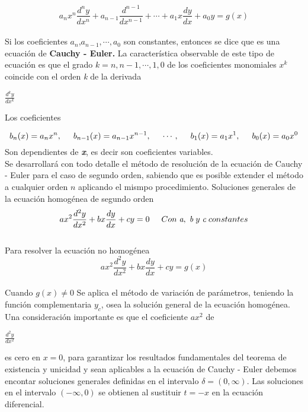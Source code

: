 \documentclass[12pt,letterpaper]{article}
\begin{document}
$$a_{n}x^{n}\frac{d^{n}y}{dx^{n}} + a_{n-1}\frac{d^{n-1}}{dx^{n-1}} + \cdots + a_{1}x\frac{dy}{dx} + a_{0}y=g(x)$$\\
Si los coeficientes 
$a_{n}$,$a_{n-1},\cdots,a_{0}$  
son constantes, entonces se dice que es una ecuación de \textbf{Cauchy - Euler.} La característica observable de este tipo de ecuación es que el grado ${k = n,n-1,}\cdots,1,0$ de los coeficientes monomiales $x^{k}$ coincide con el orden 
\emph{k} de la derivada \begin{Large} $\frac{d^{k}y}{dx^{k}}$
\end{Large}
\begin{flushleft}
Los coeficientes\\
\end{flushleft}
$$b_{n}(x)=a_{n}x^{n},\hspace{0.5cm}b_{n-1}(x)=a_{n-1}x^{n-1},\hspace{0.5cm}\cdots,\hspace{0.5cm}b_{1}(x)=a_{1}x^{1},\hspace{0.5cm}b_{0}(x)=a_{0}x^{0}$$
Son dependientes de \textbf{\emph{x}}, es decir son coeficientes variables.\\
Se desarrollará con todo detalle el método de resolución de la ecuación de Cauchy - Euler para el caso de segundo orden, sabiendo que es posible extender el método a cualquier orden $n$ aplicando el mismpo procedimiento.
Soluciones generales de la ecuación homogénea de segundo orden\\
$$ax^{2}\frac{d^{2}y}{dx^{2}}+bx\frac{dy}{dx}+cy=0 \hspace{0.5cm} Con \hspace{0.1cm}\emph{a},\hspace{0.1cm} \emph{b}\hspace{0.1cm} y  \hspace{0.1cm}\emph{c} \hspace{0.1cm}constantes$$\\
Para resolver la ecuación no homogénea\\
$$ax^{2}\frac{d^{2}y}{dx^{2}}+bx\frac{dy}{dx}+cy=g(x)$$\\
Cuando $g(x)\neq 0$ Se aplica el método de variación de parámetros, teniendo la función complementaria $y_{c}$, osea la solución general de la ecuación homogénea.
Una consideración importante es que el coeficiente $ax^{2}$ de \begin{Large}$\frac{d^{2}y}{dx^{2}}$\end{Large} es cero en $x=0$, para garantizar los resultados fundamentales del teorema de existencia y unicidad y sean aplicables a la ecuación de Cauchy - Euler debemos encontar soluciones generales definidas en el intervalo $\delta=(0,\infty)$. Las soluciones en el intervalo $(-\infty,0)$ se obtienen al sustituir $t = -x$ en la ecuación diferencial.
\end{document}
